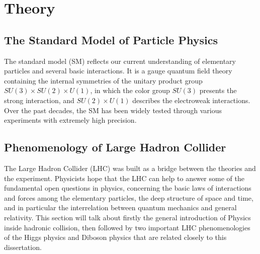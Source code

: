 
\chapter{Theory}

\section{The Standard Model of Particle Physics}
The standard model (SM) reflects our current understanding of elementary particles and several basic interactions.
It is a gauge quantum field theory containing the internal symmetries of the unitary product group $SU(3) \times SU(2) \times U(1)$, 
in which the color group $SU(3)$ presents the strong interaction, and $SU(2) \times U(1)$ describes the electroweak interactions.
Over the past decades, the SM has been widely tested through various experiments with extremely high precision.






\section{Phenomenology of Large Hadron Collider}
The Large Hadron Collider (LHC) was built as a bridge between the theories and the experiment.
Physicists hope that the LHC can help to answer some of the fundamental open questions in physics, 
concerning the basic laws of interactions and forces among the elementary particles, 
the deep structure of space and time, and in particular the interrelation between quantum mechanics and general relativity.
This section will talk about firstly the general introduction of Physics inside hadronic collision,
then followed by two important LHC phenomenologies of the Higgs physics and Diboson physics that are related closely to this dissertation.




